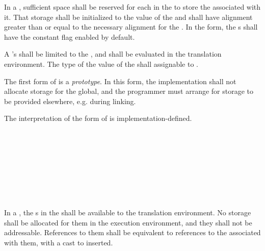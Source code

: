 \specsubsubitem
In a , sufficient space shall be reserved for
each  in the  to store
the  associated with it. That storage shall be initialized to
the value of the  and shall have alignment greater than
or equal to the necessary alignment for the . In the
 form, the s shall have the constant flag
enabled by default.

\specsubsubitem
A 's  shall be limited to
the , and shall be evaluated
in the translation environment. The type of the value of the
 shall assignable to .

\specsubsubitem
The first form of  is a \textit{prototype}. In this
form, the implementation shall not allocate storage for the global, and the
programmer must arrange for storage to be provided elsewhere, e.g. during linking.

\specsubsubitem
The interpretation of the  form of  is
implementation-defined.


\begin{grammar}
 \\
	  \\

 \\
	 \optional{\terminal{,}} \\
	 \terminal{,}  \\

 \\
	 \terminal{:}  \terminal{=}  \\
\end{grammar}

\specsubsubitem
In a , the s in the
 shall be available to the translation
environment. No storage shall be allocated for them in the execution
environment, and they shall not be addressable. References to them shall be
equivalent to references to the  associated with them,
with a cast to  inserted.

